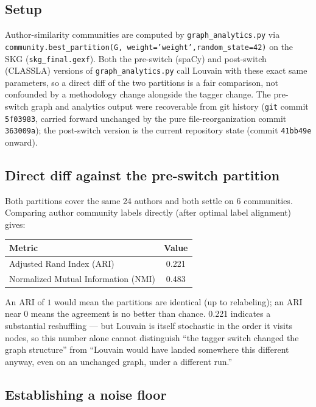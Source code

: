 \documentclass[11pt]{article}
\begin{document}
\subsection{Setup}

Author-similarity communities are computed by
\texttt{graph\_analytics.py} via \texttt{community.best\_partition(G,\allowbreak
weight='weight',\allowbreak random\_state=42)} on the SKG
(\texttt{skg\_final.gexf}). Both the pre-switch (spaCy) and post-switch
(CLASSLA) versions of \texttt{graph\_analytics.py} call Louvain with these
exact same parameters, so a direct diff of the two partitions is a fair
comparison, not confounded by a methodology change alongside the tagger
change. The pre-switch graph and analytics output were recoverable from git
history (\texttt{git} commit \texttt{5f03983}, carried forward unchanged by
the pure file-reorganization commit \texttt{363009a}); the post-switch
version is the current repository state (commit \texttt{41bb49e} onward).

\subsection{Direct diff against the pre-switch partition}

Both partitions cover the same 24 authors and both settle on 6 communities.
Comparing author community labels directly (after optimal label alignment)
gives:

\begin{center}
\begin{tabular}{lc}
\toprule
Metric & Value \\
\midrule
Adjusted Rand Index (ARI) & 0.221 \\
Normalized Mutual Information (NMI) & 0.483 \\
\bottomrule
\end{tabular}
\end{center}

An ARI of $1$ would mean the partitions are identical (up to relabeling); an
ARI near $0$ means the agreement is no better than chance. 0.221 indicates a
substantial reshuffling — but Louvain is itself stochastic in the order it
visits nodes, so this number alone cannot distinguish ``the tagger switch
changed the graph structure'' from ``Louvain would have landed somewhere
this different anyway, even on an unchanged graph, under a different run.''

\subsection{Establishing a noise floor}
\end{document}
